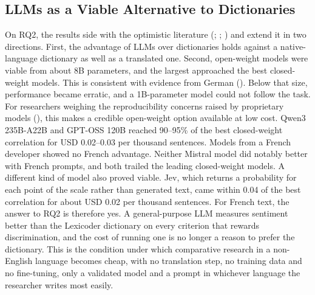 \documentclass[
  man,
  floatsintext,
  longtable,
  nolmodern,
  notxfonts,
  notimes,
  colorlinks=true,linkcolor=blue,citecolor=blue,urlcolor=blue]{apa7}
\begin{document}
\subsection{LLMs as a Viable Alternative to
Dictionaries}\label{llms-as-a-viable-alternative-to-dictionaries}

On RQ2, the results side with the optimistic literature
(; ;
) and
extend it in two directions. First, the advantage of LLMs over
dictionaries holds against a native-language dictionary as well as a
translated one. Second, open-weight models were viable from about 8B
parameters, and the largest approached the best closed-weight models.
This is consistent with evidence from German
(). Below that size, performance became erratic, and a 1B-parameter
model could not follow the task. For researchers weighing the
reproducibility concerns raised by proprietary models
(),
this makes a credible open-weight option available at low cost. Qwen3
235B-A22B and GPT-OSS 120B reached 90--95\% of the best closed-weight
correlation for USD 0.02--0.03 per thousand sentences. Models from a
French developer showed no French advantage. Neither Mistral model did
notably better with French prompts, and both trailed the leading
closed-weight models. A different kind of model also proved viable. Jev,
which returns a probability for each point of the scale rather than
generated text, came within 0.04 of the best correlation for about USD
0.02 per thousand sentences. For French text, the answer to RQ2 is
therefore yes. A general-purpose LLM measures sentiment better than the
Lexicoder dictionary on every criterion that rewards discrimination, and
the cost of running one is no longer a reason to prefer the dictionary.
This is the condition under which comparative research in a non-English
language becomes cheap, with no translation step, no training data and
no fine-tuning, only a validated model and a prompt in whichever
language the researcher writes most easily.
\end{document}
